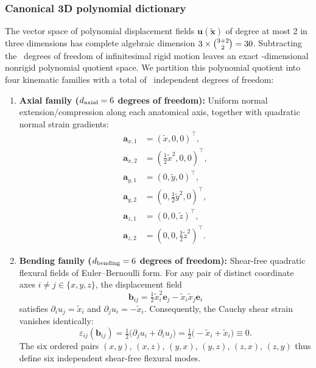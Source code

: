 \documentclass[pdflatex,sn-basic]{sn-jnl}
\begin{document}
\subsubsection{Canonical 3D polynomial dictionary}
The vector space of polynomial displacement fields $\mathbf u(\tilde{\mathbf x})$ of degree at most 2 in three dimensions has complete algebraic dimension $3 \times \binom{3+2}{2} = 30$.
Subtracting the \RigidDOFs\ degrees of freedom of infinitesimal rigid motion leaves an exact \NonrigidDOFs-dimensional nonrigid polynomial quotient space.
We partition this polynomial quotient into four kinematic families with a total of \NonrigidDOFs\ independent degrees of freedom:
\begin{enumerate}[label=(\roman*)]
\item \textbf{Axial family ($d_{\rm axial} = 6$ degrees of freedom):}
Uniform normal extension/compression along each anatomical axis, together with quadratic normal strain gradients:
\begin{equation}
\begin{aligned}
\mathbf a_{x,1} &= (\tilde x, 0, 0)^\top, \\
 \mathbf a_{x,2} &= (\tfrac{1}{2}\tilde x^2, 0, 0)^\top, \\
\mathbf a_{y,1} &= (0, \tilde y, 0)^\top, \\
 \mathbf a_{y,2} &= (0, \tfrac{1}{2}\tilde y^2, 0)^\top, \\
\mathbf a_{z,1} &= (0, 0, \tilde z)^\top, \\
 \mathbf a_{z,2} &= (0, 0, \tfrac{1}{2}\tilde z^2)^\top.
\end{aligned}
\label{eq:axial-family}
\end{equation}

\item \textbf{Bending family ($d_{\rm bending} = 6$ degrees of freedom):}
Shear-free quadratic flexural fields of Euler--Bernoulli form.
For any pair of distinct coordinate axes $i \ne j \in \{x, y, z\}$, the displacement field
\begin{equation}
\mathbf b_{ij} = \tfrac{1}{2}\tilde x_i^2 \mathbf e_j - \tilde x_i \tilde x_j \mathbf e_i
\label{eq:bending-family}
\end{equation}
satisfies $\partial_i u_j = \tilde x_i$ and $\partial_j u_i = -\tilde x_i$.
Consequently, the Cauchy shear strain vanishes identically:
\begin{equation}
\varepsilon_{ij}(\mathbf b_{ij}) = \tfrac{1}{2}\big(\partial_j u_i + \partial_i u_j\big) = \tfrac{1}{2}\big(-\tilde x_i + \tilde x_i\big) \equiv 0.
\end{equation}
The six ordered pairs $(x,y)$, $(x,z)$, $(y,x)$, $(y,z)$, $(z,x)$, $(z,y)$ thus define six independent shear-free flexural modes.


\end{enumerate}
\end{document}

